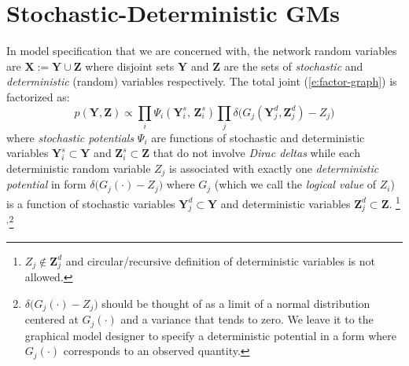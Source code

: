\documentclass[]{article}
\newcommand{\bvec}[1]{\textbf{#1}}
\newcommand{\pr}{p}
\begin{document}
\section{Stochastic-Deterministic GMs}
\label{sect:contribution1}
In model specification that we are concerned with,
the network random variables are $\bvec{X} := \bvec{Y} \cup \bvec{Z}$
where disjoint sets $\bvec{Y}$ and $\bvec{Z}$ are the sets of \emph{stochastic} and \emph{deterministic}  (random) variables respectively. 
The total joint 
(\ref{e:factor-graph}) is factorized as:
\begin{equation}
\label{e:infer.sd}
\pr(\bvec{Y}, \bvec{Z}) \propto 
\prod_{i} \Psi_i (\bvec{Y}^s_i, \, \bvec{Z}^s_i)
\prod_j \delta \big(
G_j(\bvec{Y}^d_j, \bvec{Z}^d_j) - Z_j
\big)
\end{equation}
where \emph{stochastic potentials} $\Psi_i$ are functions 
of stochastic and deterministic variables 
$\bvec{Y}^s_i \subset \bvec{Y}$ and $\bvec{Z}^s_i \subset \bvec{Z}$ 
that do not involve 
\emph{Dirac deltas} while 
each deterministic random variable $Z_j$ 
is associated with exactly one 
\emph{deterministic potential} in form 
$\delta\big( G_j(\cdot) - Z_j \big)$ 
 where 
$G_j$ (which we call the \emph{logical value} of $Z_i$) 
 is a function of 
stochastic variables $\bvec{Y}_j^d \subset \bvec{Y}$ and deterministic variables $\bvec{Z}_j^d \subset \bvec{Z}$. 
\footnote{
$Z_j \not \in \bvec{Z}_j^d$ 
and circular/recursive definition of deterministic variables is not allowed. }$^{,}$\footnote{
$\delta\big( G_j(\cdot) - Z_j \big)$ should be thought of as a limit of a normal distribution centered at $G_j(\cdot)$ and a variance that tends to zero.
We leave it to the graphical model designer to specify a deterministic potential in a form where $G_j(\cdot)$ corresponds to an observed quantity.}
\end{document}
